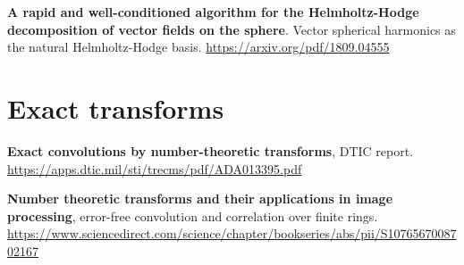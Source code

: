 \textbf{A rapid and well-conditioned algorithm for the Helmholtz-Hodge decomposition of vector fields
on the sphere}. Vector spherical harmonics as the natural Helmholtz-Hodge basis.
\url{https://arxiv.org/pdf/1809.04555}

\section*{Exact transforms}

\textbf{Exact convolutions by number-theoretic transforms}, DTIC report.
\url{https://apps.dtic.mil/sti/trecms/pdf/ADA013395.pdf}

\textbf{Number theoretic transforms and their applications in image processing}, error-free
convolution and correlation over finite rings.
\url{https://www.sciencedirect.com/science/chapter/bookseries/abs/pii/S1076567008702167}

